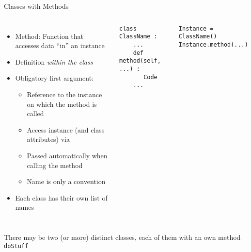 
\begin{frame}[fragile]{Classes with Methods}
%
\vspace{-10pt}
\begin{columns}[t]
\begin{itemize}
\item Method: Function that accesses data \enquote{in} an instance
\item Definition \emph{within the class}
\item Obligatory first argument: 
	\begin{itemize}
	\item Reference to the instance on which the method is called
	\item[\Thus] Access instance (and class attributes) via 
	\item Passed automatically when calling the method
	\item Name  is only a convention
	\end{itemize}
\item Each class has their own list of names
\end{itemize}
%
\begin{codebox}
\begin{verbatim}
class ClassName :
    ...
    def method(self, ...) :
       Code
    ...
\end{verbatim}
\end{codebox}
%
\begin{codebox}
\begin{verbatim}
Instance = ClassName()
Instance.method(...)
\end{verbatim}
\end{codebox}
\end{columns}

\vspace{5pt}
\begin{center}
\small \Thus There may be two (or more) distinct classes, each of them with an own method \texttt{doStuff}
\end{center}
%
\end{frame}


